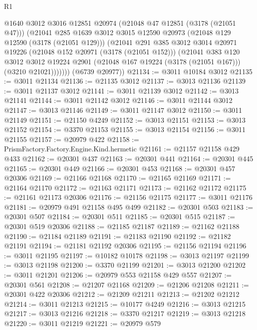 \begin{lexlean}{R1}
\begin{coremodule}
            @1640
            @3012
            @3016
            @12851
            @20974
            (@21048 @47 @12851 (@3178 (@21051 @47)))
            (@21041
              @285
              @1639
              @3012
              @3015
              @12590
              @20973
              (@21048 @129 @12590 (@3178 (@21051 @129)))
              (@21041
                @291
                @385
                @3012
                @3014
                @20971
                @19226
                (@21048 @152 @20971 (@3178 (@21051 @152)))
                (@21041
                  @383
                  @120
                  @3012
                  @3012
                  @19224
                  @2901
                  (@21048 @167 @19224 (@3178 (@21051 @167)))
                  (@3210 @21021)))))))
      (@6739 @20977))
@21134 := @3011 @10184 @3012
@21135 := @3011 @21134
@21136 := @21135 @3012
@21137 := @3013 @21136
@21139 := @3011 @21137 @3012
@21141 := @3011 @21139 @3012
@21142 := @3013 @21141
@21144 := @3011 @21142 @3012
@21146 := @3011 @21144 @3012
@21147 := @3013 @21146
@21149 := @3011 @21147 @3012
@21150 := @3011 @21149
@21151 := @21150 @4249
@21152 := @3013 @21151
@21153 := @3013 @21152
@21154 := @3370 @21153
@21155 := @3013 @21154
@21156 := @3011 @21155
@21157 := @20979 @422
@21158 := PrismFactory.Factory.Engine.Kind.hermetic
@21161 := @21157 @21158 @429 @433
@21162 := @20301 @437
@21163 := @20301 @441
@21164 := @20301 @445
@21165 := @20301 @449
@21166 := @20301 @453
@21168 := @20301 @457 @20306
@21169 := @21166 @21168
@21170 := @21165 @21169
@21171 := @21164 @21170
@21172 := @21163 @21171
@21173 := @21162 @21172
@21175 := @21161 @21173 @20306
@21176 := @21156 @21175
@21177 := @3011 @21176
@21181 := @20979 @491 @21158 @495 @499
@21182 := @20301 @503
@21183 := @20301 @507
@21184 := @20301 @511
@21185 := @20301 @515
@21187 := @20301 @519 @20306
@21188 := @21185 @21187
@21189 := @21162 @21188
@21190 := @21184 @21189
@21191 := @21183 @21190
@21192 := @21182 @21191
@21194 := @21181 @21192 @20306
@21195 := @21156 @21194
@21196 := @3011 @21195
@21197 := @10182 @10178
@21198 := @3013 @21197
@21199 := @3013 @21198
@21200 := @3370 @21199
@21201 := @3013 @21200
@21202 := @3011 @21201
@21206 := @20979 @553 @21158 @429 @557
@21207 := @20301 @561
@21208 := @21207 @21168
@21209 := @21206 @21208
@21211 := @20301 @422 @20306
@21212 := @21209 @21211
@21213 := @21202 @21212
@21214 := @3011 @21213
@21215 := @10177 @4249
@21216 := @3013 @21215
@21217 := @3013 @21216
@21218 := @3370 @21217
@21219 := @3013 @21218
@21220 := @3011 @21219
@21221 := @20979 @579

\end{coremodule}
\end{lexlean}
